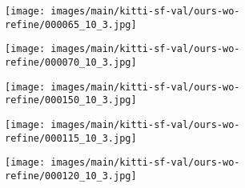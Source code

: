 \documentclass[10pt,twocolumn,letterpaper]{article}
\begin{document}
\begin{figure*}
    \begin{subfigure}[b]{0.02\linewidth}
        \centering
    \end{subfigure}\hfill
    \begin{subfigure}[b]{0.19\linewidth}
        \texttt{[image: images/main/kitti-sf-val/ours-wo-refine/000065\_10\_3.jpg]}
    \end{subfigure}\hfill
    \begin{subfigure}[b]{0.19\linewidth}
        \texttt{[image: images/main/kitti-sf-val/ours-wo-refine/000070\_10\_3.jpg]}
    \end{subfigure}\hfill
    \begin{subfigure}[b]{0.19\linewidth}
        \texttt{[image: images/main/kitti-sf-val/ours-wo-refine/000150\_10\_3.jpg]}
    \end{subfigure}\hfill
    \begin{subfigure}[b]{0.19\linewidth}
        \texttt{[image: images/main/kitti-sf-val/ours-wo-refine/000115\_10\_3.jpg]}
    \end{subfigure}\hfill
    \begin{subfigure}[b]{0.19\linewidth}
        \texttt{[image: images/main/kitti-sf-val/ours-wo-refine/000120\_10\_3.jpg]}
    \end{subfigure}\hfill
    \begin{subfigure}[b]{0.02\linewidth}
        \hspace{10pt}
    \end{subfigure}\hfill


\end{figure*}
\end{document}
